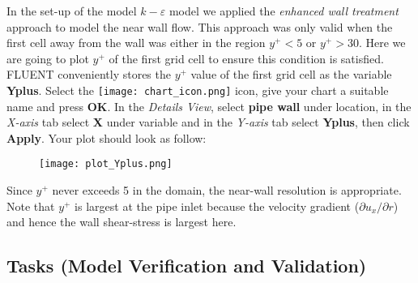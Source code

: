 \documentclass[11pt,a4paper,oneside]{scrartcl}
\newcommand\bfr[1]{\textcolor[rgb]{1,0.00,0.00}{\textbf{\textsf{#1}}}}
\begin{document}
In the set-up of the model $k-\varepsilon$ model we applied the \emph{enhanced wall treatment} approach to model the near wall flow. This approach was only valid when the first cell away from the wall was either in the region $y^+<5$ or $y^+>30$. Here we are going to plot $y^+$ of the first grid cell to ensure this condition is satisfied. FLUENT conveniently stores the $y^+$ value of the first grid cell as the variable \bfr{Yplus}. Select the \texttt{[image: chart\_icon.png]} icon, give your chart a suitable name and press \bfr{OK}. In the \emph{Details View}, select \bfr{pipe wall} under location, in the \emph{X-axis} tab select \bfr{X} under variable and in the \emph{Y-axis} tab select \bfr{Yplus}, then click \bfr{Apply}. Your plot should look as follow:

\begin{figure}[H]
\begin{center}
\texttt{[image: plot\_Yplus.png]}
\end{center}
\end{figure}

Since $y^+$ never exceeds 5 in the domain, the near-wall resolution is appropriate. Note that $y^{+}$ is largest at the pipe inlet because the velocity gradient ($\partial u_{x}/\partial r$) and hence the wall shear-stress is largest here.

\subsection{Tasks (Model Verification and Validation)}
\end{document}
